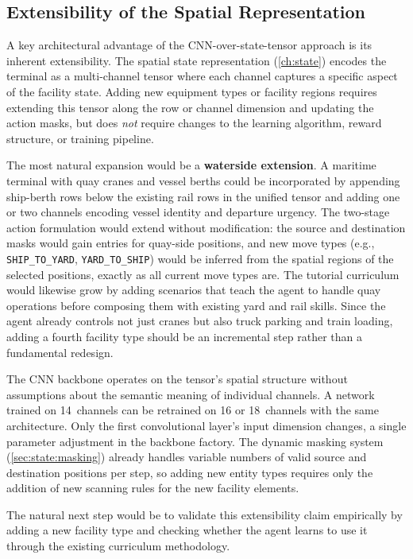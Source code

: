 \subsection{Extensibility of the Spatial Representation}
\label{sec:concl:future:extensibility}

A key architectural advantage of the CNN-over-state-tensor approach is its inherent extensibility. The spatial state representation (\cref{ch:state}) encodes the terminal as a multi-channel tensor where each channel captures a specific aspect of the facility state. Adding new equipment types or facility regions requires extending this tensor along the row or channel dimension and updating the action masks, but does \emph{not} require changes to the learning algorithm, reward structure, or training pipeline.

The most natural expansion would be a \textbf{waterside extension}. A maritime terminal with quay cranes and vessel berths could be incorporated by appending ship-berth rows below the existing rail rows in the unified tensor and adding one or two channels encoding vessel identity and departure urgency. The two-stage action formulation would extend without modification: the source and destination masks would gain entries for quay-side positions, and new move types (e.g., \texttt{SHIP\_TO\_YARD}, \texttt{YARD\_TO\_SHIP}) would be inferred from the spatial regions of the selected positions, exactly as all current move types are. The tutorial curriculum would likewise grow by adding scenarios that teach the agent to handle quay operations before composing them with existing yard and rail skills. Since the agent already controls not just cranes but also truck parking and train loading, adding a fourth facility type should be an incremental step rather than a fundamental redesign.

The CNN backbone operates on the tensor's spatial structure without assumptions about the semantic meaning of individual channels. A network trained on 14~channels can be retrained on 16 or 18~channels with the same architecture. Only the first convolutional layer's input dimension changes, a single parameter adjustment in the backbone factory. The dynamic masking system (\cref{sec:state:masking}) already handles variable numbers of valid source and destination positions per step, so adding new entity types requires only the addition of new scanning rules for the new facility elements.

The natural next step would be to validate this extensibility claim empirically by adding a new facility type and checking whether the agent learns to use it through the existing curriculum methodology.

